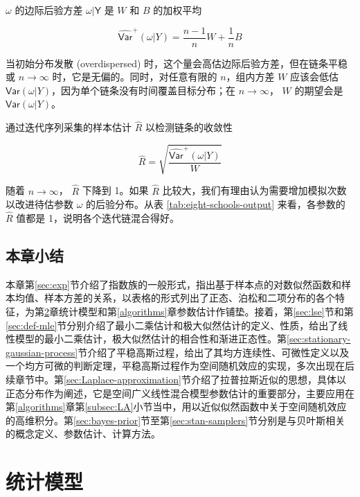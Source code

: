 \documentclass[12pt,a4paper,UTF8,twoside]{book}
\theoremstyle{definition}
\theoremstyle{definition}
\theoremstyle{definition}
\theoremstyle{remark}
\begin{document}
\noindent \(\omega\) 的边际后验方差 \(\mathsf{\omega|Y}\) 是 \(W\) 和
\(B\) 的加权平均

\begin{equation}
\widehat{\mathsf{Var}}^{+}(\omega|Y) = \frac{n-1}{n} W + \frac{1}{n} B 
\end{equation}

当初始分布发散 (overdispersed)
时，这个量会高估边际后验方差，但在链条平稳或 \(n \to \infty\)
时，它是无偏的。同时，对任意有限的 \(n\)，组内方差 \(W\) 应该会低估
\(\mathsf{Var}(\omega|Y)\)，因为单个链条没有时间覆盖目标分布；在
\(n \to \infty\)， \(W\) 的期望会是 \(\mathsf{Var}(\omega|Y)\)。

通过迭代序列采集的样本估计 \(\hat{R}\) 以检测链条的收敛性

\begin{equation}
\hat{R} = \sqrt{\frac{\widehat{\mathsf{Var}}^{+}(\omega|Y)}{W}}
\end{equation}

\noindent 随着 \(n \to \infty\)， \(\hat{R}\) 下降到 1。如果 \(\hat{R}\)
比较大，我们有理由认为需要增加模拟次数以改进待估参数 \(\omega\)
的后验分布。从表 \ref{tab:eight-schools-output} 来看，各参数的
\(\hat{R}\) 值都是 1，说明各个迭代链混合得好。

\hypertarget{sec:foundations}{%
\section{本章小结}\label{sec:foundations}}

本章第\ref{sec:exp}节介绍了指数族的一般形式，指出基于样本点的对数似然函数和样本均值、样本方差的关系，以表格的形式列出了正态、泊松和二项分布的各个特征，为第\ref{models}章统计模型和第\ref{algorithms}章参数估计作铺垫。接着，第\ref{sec:lse}节和第\ref{sec:def-mle}节分别介绍了最小二乘估计和极大似然估计的定义、性质，给出了线性模型的最小二乘估计，极大似然估计的相合性和渐进正态性。第\ref{sec:stationary-gaussian-process}节介绍了平稳高斯过程，给出了其均方连续性、可微性定义以及一个均方可微的判断定理，平稳高斯过程作为空间随机效应的实现，多次出现在后续章节中。第\ref{sec:Laplace-approximation}节介绍了拉普拉斯近似的思想，具体以正态分布作为阐述，它是空间广义线性混合模型参数估计的重要部分，主要应用在第\ref{algorithms}章第\ref{subsec:LA}小节当中，用以近似似然函数中关于空间随机效应的高维积分。第\ref{sec:bayes-prior}节至第\ref{sec:stan-samplers}节分别是与贝叶斯相关的概念定义、参数估计、计算方法。

\hypertarget{models}{%
\chapter{统计模型}\label{models}}
\end{document}
